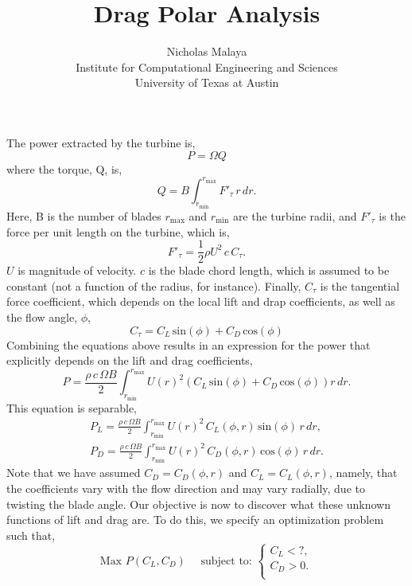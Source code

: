 \documentclass{article}
\title{\bf{Drag Polar Analysis}}
\author{Nicholas Malaya \\ Institute for Computational Engineering and Sciences \\ University of Texas at Austin} \date{}
\begin{document}
\maketitle

\newpage

The power extracted by the turbine is, 
\begin{equation}
 P = \Omega Q
\end{equation}
where the torque, Q, is, 
\begin{equation}
 Q = B \int_{r_{\text{min}}}^{r_{\text{max}}} F'_{\tau}\, r\, dr.
\end{equation}
Here, B is the number of blades $r_{\text{max}}$ and $r_{\text{min}}$
are the turbine radii, and $F'_{\tau}$ is the force per unit
length on the turbine, which is, 
\begin{equation}
 F'_{\tau} = \frac{1}{2}\rho U^2 \, c \, C_{\tau}.
\end{equation}
$U$ is magnitude of velocity. $c$ is the blade chord
length, which is assumed to be constant (not a function of the radius,
for instance). Finally, $C_{\tau}$ is the tangential force coefficient,
which depends on the local lift and drap coefficients, as well as the
flow angle, $\phi$, 
\begin{equation}
 C_{\tau} = C_L \,\text{sin}(\phi) + C_D \,\text{cos}(\phi)
\end{equation}
Combining the equations above results in an expression for the power
that explicitly depends on the lift and drag coefficients, 
\begin{equation*}
 P = \frac{\rho\, c\, \Omega B}{2}
  \int_{r_{\text{min}}}^{r_{\text{max}}} U(r)^2 \left(C_L
						     \,\text{sin}(\phi)
						     + C_D
						     \,\text{cos}(\phi)
						    \right) r\,dr. 
\end{equation*}
This equation is separable, 
\begin{align*}
 P_L = \frac{\rho\, c\, \Omega B}{2}
  \int_{r_{\text{min}}}^{r_{\text{max}}} U(r)^2 \, C_L(\phi,r) \,\text{sin}(\phi)\, r\,dr, \\
 P_D = \frac{\rho\, c\, \Omega B}{2}
  \int_{r_{\text{min}}}^{r_{\text{max}}} U(r)^2 \, C_D(\phi,r) \,\text{cos}(\phi)\, r\,dr. 
\end{align*}
Note that we have assumed $C_D = C_D(\phi,r)$ and $C_L = C_L(\phi,r)$,
namely, that the coefficients vary with the flow direction and may vary
radially, due to twisting the blade angle. Our objective is
now to discover what these unknown functions of lift and drag are. To do
this, we specify an optimization problem such that, 
\begin{equation*} 
 \text{Max } P(C_L,C_D) \quad \text{ subject to: }
  \begin{cases}
    C_L < ?, \\
    C_D > 0. \\
  \end{cases}
\end{equation*}
\end{document}

